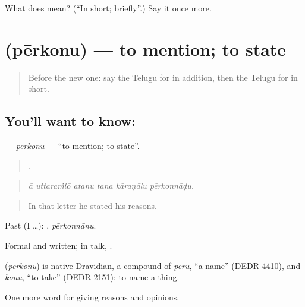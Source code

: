 \begin{tcolorbox}[breakable,colback=teal!4,colframe=teal!35!black,title={Before you move on}]
What does  mean? (\textquotedblleft{}In short; briefly\textquotedblright{}.) Say it once more.
\end{tcolorbox}
\section[\texorpdfstring{\te{పేర్కొను} (pērkonu)}{పేర్కొను (pērkonu)}]{ (pērkonu) — to mention; to state}

\label{lesson:TE-C397-perkonu}



\begin{quote}
Before the new one: say the Telugu for in addition, then the Telugu for in short.
\end{quote}

\subsection*{You'll want to know: }
\textbf{} — \emph{pērkonu} — \textquotedblleft{}to mention; to state\textquotedblright{}.

\begin{quote}
     .
\end{quote}

\begin{quote}
\emph{ā uttaraṁlō atanu tana kāraṇālu pērkonnāḍu.}
\end{quote}

\begin{quote}
In that letter he stated his reasons.
\end{quote}

Past (I …): , \emph{pērkonnānu}.

Formal and written; in talk, .

\begin{cousinweb}
\textbf{} (\emph{pērkonu}) is native Dravidian, a compound of \emph{pēru}, \textquotedblleft{}a name\textquotedblright{} (DEDR 4410), and \emph{konu}, \textquotedblleft{}to take\textquotedblright{} (DEDR 2151): to name a thing.
\end{cousinweb}

\begin{grammarlens}[title={What you've built}]
One more word for giving reasons and opinions.
\end{grammarlens}

